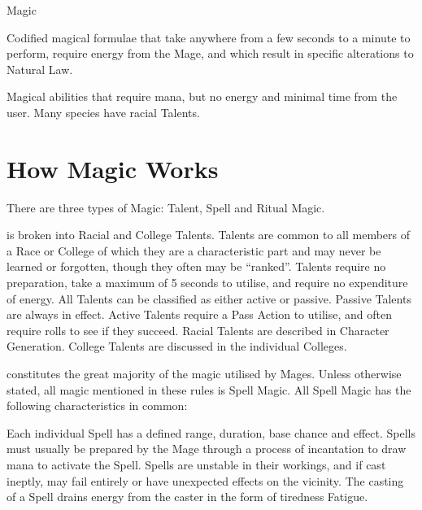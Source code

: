 \begin{Chapter}{Magic}
\begin{Description}
\item[Spell Magic] Codified magical formulae that take anywhere from a
  few seconds to a minute to perform, require energy from the Mage,
  and which result in specific alterations to Natural Law.

\item[Talent Magic] Magical abilities that require mana, but no energy
  and minimal time from the user.  Many species have racial Talents.

\end{Description}

\section{How Magic Works}

There are three types of Magic: Talent, Spell and Ritual Magic.

\begin{Description}
  
\item[Talent Magic] is broken into Racial and College Talents.
  Talents are common to all members of a Race or College of which they
  are a characteristic part and may never be learned or forgotten,
  though they often may be “ranked”.  Talents require no preparation,
  take a maximum of 5 seconds to utilise, and require no expenditure
  of energy.  All Talents can be classified as either active or
  passive.  Passive Talents are always in effect. Active Talents
  require a Pass Action to utilise, and often require rolls to see if
  they succeed.  Racial Talents are described in Character
  Generation. College Talents are discussed in the individual
  Colleges.

\item[Spell Magic] constitutes the great majority of the magic
  utilised by Mages.  Unless otherwise stated, all magic mentioned in
  these rules is Spell Magic.  All Spell Magic has the following
  characteristics in common:

  Each individual Spell has a defined range, duration, base chance and
  effect. Spells must usually be prepared by the Mage through a
  process of incantation to draw mana to activate the Spell.  Spells
  are unstable in their workings, and if cast ineptly, may fail
  entirely or have unexpected effects on the vicinity. The casting of
  a Spell drains energy from the caster in the form of tiredness
  Fatigue.


\end{Description}
\end{Chapter}
